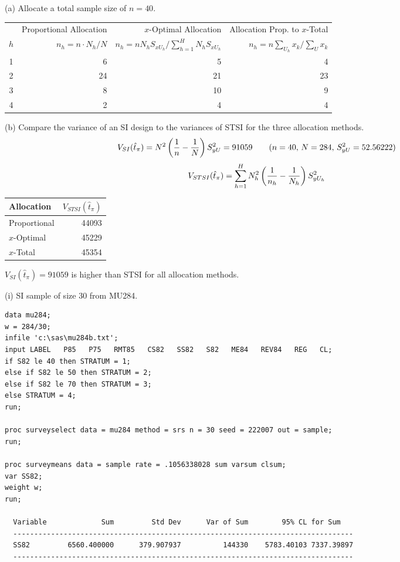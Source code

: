 \documentclass[12pt]{article}
\begin{document}
(a) Allocate a total sample size of $n=40$.

\begin{center}
\begin{tabular}{|c|r|r|r|}
\hline
& Proportional Allocation & $x$-Optimal Allocation &
Allocation Prop. to $x$-Total\\
$h$ & $n_h=n\cdot N_h/N$ &
$n_h=nN_hS_{xU_h}\big/\sum_{h=1}^HN_hS_{xU_h}$ &
$n_h=n\sum_{U_h}x_k\big/\sum_Ux_k$\\
\hline
1 & 6 & 5 & 4\\
2 & 24 & 21 & 23\\
3 & 8 & 10 & 9\\
4 & 2 & 4 & 4\\
\hline
\end{tabular}
\end{center}

(b) Compare the variance of an SI design to the
variances of STSI for the three allocation methods.
\[
V_{SI}(\hat t_\pi)=N^2\left({1\over n}-{1\over N}\right)S_{yU}^2=91059
\qquad(n=40,\,N=284,\,S_{yU}^2=52.56222)
\]
\[
V_{STSI}(\hat t_\pi)=\sum_{h=1}^HN_h^2\left(
{1\over n_h}-{1\over N_h}\right)S_{yU_h}^2
\]

\begin{center}
\begin{tabular}{|l|r|}
\hline
Allocation & $V_{STSI}(\hat t_\pi)$ \\
\hline
Proportional & 44093\\
$x$-Optimal & 45229\\
$x$-Total & 45354\\
\hline
\end{tabular}
\end{center}

$V_{SI}(\hat t_\pi)=91059$ is higher than STSI for all allocation methods.


(i) SI sample of size 30 from MU284.

\begin{verbatim}
data mu284;
w = 284/30;
infile 'c:\sas\mu284b.txt';
input LABEL   P85   P75   RMT85   CS82   SS82   S82   ME84   REV84   REG   CL;
if S82 le 40 then STRATUM = 1;
else if S82 le 50 then STRATUM = 2;
else if S82 le 70 then STRATUM = 3;
else STRATUM = 4;
run;

proc surveyselect data = mu284 method = srs n = 30 seed = 222007 out = sample;
run;

proc surveymeans data = sample rate = .1056338028 sum varsum clsum;
var SS82;
weight w;
run;

  Variable             Sum         Std Dev      Var of Sum        95% CL for Sum
  ---------------------------------------------------------------------------------
  SS82         6560.400000      379.907937          144330    5783.40103 7337.39897
  ---------------------------------------------------------------------------------
\end{verbatim}
\end{document}
